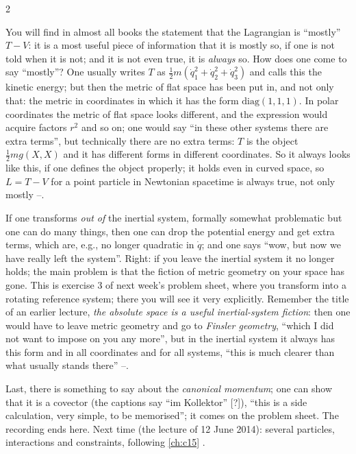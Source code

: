 \begin{paracol}{2}
\begin{aside}[$L=T-V$: not ``mostly'' but always (as said in class)]\label{as:var-TV}
You will find in almost all books the statement that the Lagrangian is ``mostly'' $T-V$: it is a most useful piece of information that it is mostly so, if one is not told when it is not; and it is not even true, it is \emph{always} so. How does one come to say ``mostly''? One usually writes $T$ as $\tfrac12m(\dot q_1^2+\dot q_2^2+\dot q_3^2)$ and calls this the kinetic energy; but then the metric of flat space has been put in, and not only that: the metric in coordinates in which it has the form $\mathrm{diag}(1,1,1)$. In polar coordinates the metric of flat space looks different, and the expression would acquire factors $r^2$ and so on; one would say ``in these other systems there are extra terms'', but technically there are no extra terms: $T$ is the object $\tfrac12mg(X,X)$ and it has different forms in different coordinates. So it always looks like this, if one defines the object properly; it holds even in curved space, so $L=T-V$ for a point particle in Newtonian spacetime is always true, not only mostly --.
\end{aside}

\begin{coursenote}\label{cn:var-rotating}
If one transforms \emph{out of} the inertial system, formally somewhat problematic but one can do many things, then one can drop the potential energy and get extra terms, which are, e.g., no longer quadratic in $\dot q$; and one says ``wow, but now we have really left the system''. Right: if you leave the inertial system it no longer holds; the main problem is that the fiction of metric geometry on your space has gone. This is exercise 3 of next week's problem sheet, where you transform into a rotating reference system; there you will see it very explicitly. Remember the title of an earlier lecture, \emph{the absolute space is a useful inertial-system fiction}: then one would have to leave metric geometry and go to \emph{Finsler geometry}, ``which I did not want to impose on you any more'', but in the inertial system it always has this form and in all coordinates and for all systems, ``this is much clearer than what usually stands there'' --.
\end{coursenote}

\begin{coursenote}\label{cn:var-end}
Last, there is something to say about the \emph{canonical momentum}; one can show that it is a covector (the captions say ``im Kollektor'' [?]), ``this is a side calculation, very simple, to be memorised''; it comes on the problem sheet. The recording ends here. Next time (the lecture of 12 June 2014): several particles, interactions and constraints, following \cref{ch:c15} .
\end{coursenote}


\end{paracol}
